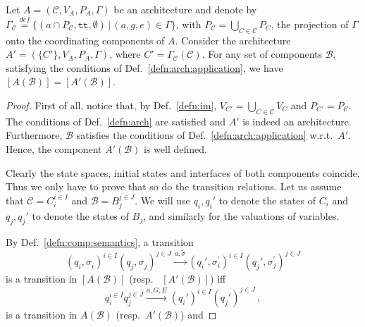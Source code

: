 \documentclass{llncs}
\newcommand{\defn}[1]{Def.~\ref{defn:#1}}
\newcommand{\cB}{\ensuremath{\mathcal{B}}}
\newcommand{\cC}{\ensuremath{\mathcal{C}}}
\newcommand{\wrt}[1][\ ]{w.r.t.#1}
\newcommand{\resp}[1][\ ]{resp.#1}
\newcommand{\bydef}[1]{\ensuremath{\stackrel{\mathit{\scriptscriptstyle def}}{#1}}}
\newcommand{\setdef}[2]{\ensuremath{\{{#1}\,|\,{#2}\}}}
\newcommand{\goesto}[2][]{\ensuremath{\xrightarrow[#1]{#2}}}
\newcommand{\true} {\ensuremath{\mathtt{t\!t}}}
\newcommand{\noop} {\ensuremath{\emptyset}} %
\newcommand{\val}[3][]{\ensuremath{#1{\sigma}^{#2}_{#3}}}
\newcommand{\export}[1][]{\ensuremath{\varepsilon_{#1}}}
\newcommand{\valdiff}[2]{\ensuremath{#1 \triangle #2}}
\newcommand{\semopen}[1]{\ensuremath{[{#1}]}}
\begin{document}
\begin{lemma}
  \label{lem:onlyone}
  Let $A = (\cC, V_A, P_A, \Gamma)$ be an architecture and denote
  by $\Gamma_\cC \bydef{=}
%
  \setdef{
    (a \cap P_\cC, \true, \noop)
  }{
    (a, g, e) \in \Gamma
  }$, with $P_\cC = \bigcup_{C \in \cC} P_C$,
%  
  the projection of $\Gamma$ onto the coordinating components of
  $A$.  Consider the architecture $A' = (\{C'\}, V_A, P_A,
  \Gamma)$, where $C' = \Gamma_\cC(\cC)$.  For any set of
  components $\cB$, satisfying the conditions of
  \defn{arch:application}, we have
  $\semopen{A(\cB)} = \semopen{A'(\cB)}$.
\end{lemma}
%
\begin{proof}
  First of all, notice that, by \defn{im},
  $V_{C'} = \bigcup_{C \in \cC} V_C$ and $P_{C'} = P_\cC$.
  The conditions of \defn{arch} are satisfied and $A'$ is indeed
  an architecture.  Furthermore, $\cB$ satisfies the conditions
  of \defn{arch:application} \wrt $A'$.  Hence, the component
  $A'(\cB)$ is well defined.

  Clearly the state spaces, initial states and interfaces of both
  components coincide.  Thus we only have to prove that so do the
  transition relations.  Let us assume that
  $\cC = C_i^{i \in I}$ and $\cB = B_j^{j \in J}$.
  We will use $q_i, q_i'$ to denote the states of
  $C_i$ and $q_j, q_j'$ to denote the states of $B_j$,
  and similarly for the valuations of variables.

  By \defn{comp:semantics}, a transition
%
  \begin{equation}
    \label{eq:lem1:trans:sem}
    (q_i, \val{}{i})^{i \in I} (q_j, \val{}{j})^{j \in J}
    \goesto{a, \val[\tilde]{}{}}
    (q_i', \val{\prime}{i})^{i \in I}
    (q_j', \val{\prime}{j})^{j \in J}
  \end{equation}
%  
  is a transition in $\semopen{A(\cB)}$ (\resp
  $\semopen{A'(\cB)}$) iff
%
  \begin{equation}
    \label{eq:lem1:trans}
    q_i^{i \in I} q_j^{j \in J}
    \goesto{a, G, E}
    (q_i')^{i \in I} (q_j')^{j \in J}
    \,,
  \end{equation}
%
  is a transition in $A(\cB)$ (\resp $A'(\cB)$) and
%


\end{proof}
\end{document}
